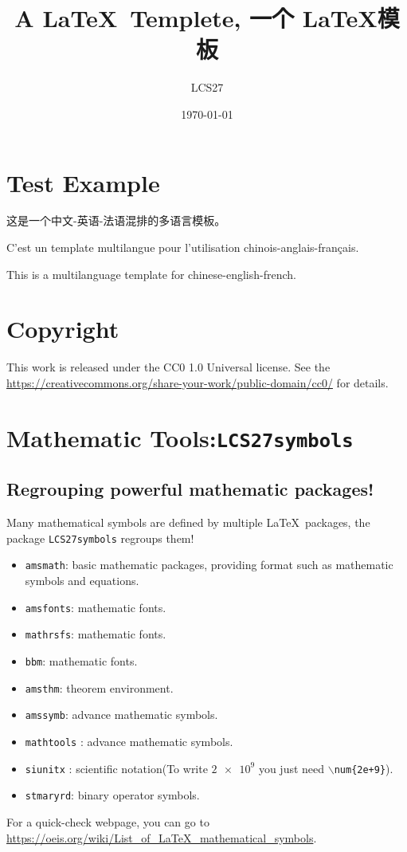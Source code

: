 \documentclass[a4paper,twoside,12pt]{article}
\title{A \LaTeX \ Templete, 一个 \LaTeX 模板}
\author{LCS27}
\institute{Overleaf模板作者}
\date{\today}
\begin{document}
\MakeSimpleTitle
\section{Test Example}
这是一个中文-英语-法语混排的多语言模板。\par
C'est un template multilangue pour l'utilisation chinois-anglais-français.\par
This is a multilanguage template for chinese-english-french.\par
\zhlipsum\par
\lipsum\par

\section{Copyright}
This work is released under the CC0 1.0 Universal license. See the \url{https://creativecommons.org/share-your-work/public-domain/cc0/} for details.

\section{Mathematic Tools:\texttt{LCS27symbols}}

\subsection{Regrouping powerful mathematic packages!}
Many mathematical symbols are defined by multiple \LaTeX \ packages, the package \texttt{LCS27symbols} regroups them!
\begin{itemize}
\item  \texttt{amsmath}: basic mathematic packages, providing format such as mathematic symbols and equations.
\item  \texttt{amsfonts}: mathematic fonts.
\item  \texttt{mathrsfs}: mathematic fonts.
\item  \texttt{bbm}: mathematic fonts.
\item  \texttt{amsthm}: theorem environment.
\item  \texttt{amssymb}: advance mathematic symbols.
\item  \texttt{mathtools} : advance mathematic symbols.
\item  \texttt{siunitx} : scientific notation(\Eg  To write $\num{2e+9}$ you just need \texttt{$\backslash$num\{2e+9\}}).
\item  \texttt{stmaryrd}: binary operator symbols.
\end{itemize}
For a quick-check webpage, you can go to \url{https://oeis.org/wiki/List_of_LaTeX_mathematical_symbols}.
\end{document}
